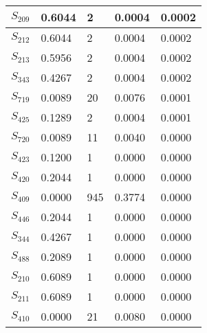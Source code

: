 \begin{xltabular}{\textwidth}{|X|X|X|X|X|}
 $S_{209}$ & 0.6044 & 2 & 0.0004 & 0.0002 \\ \hline
 $S_{212}$ & 0.6044 & 2 & 0.0004 & 0.0002 \\ \hline
 $S_{213}$ & 0.5956 & 2 & 0.0004 & 0.0002 \\ \hline
 $S_{343}$ & 0.4267 & 2 & 0.0004 & 0.0002 \\ \hline
 $S_{719}$ & 0.0089 & 20 & 0.0076 & 0.0001 \\ \hline
 $S_{425}$ & 0.1289 & 2 & 0.0004 & 0.0001 \\ \hline
 $S_{720}$ & 0.0089 & 11 & 0.0040 & 0.0000 \\ \hline
 $S_{423}$ & 0.1200 & 1 & 0.0000 & 0.0000 \\ \hline
 $S_{420}$ & 0.2044 & 1 & 0.0000 & 0.0000 \\ \hline
 $S_{409}$ & 0.0000 & 945 & 0.3774 & 0.0000 \\ \hline
 $S_{446}$ & 0.2044 & 1 & 0.0000 & 0.0000 \\ \hline
 $S_{344}$ & 0.4267 & 1 & 0.0000 & 0.0000 \\ \hline
 $S_{488}$ & 0.2089 & 1 & 0.0000 & 0.0000 \\ \hline
 $S_{210}$ & 0.6089 & 1 & 0.0000 & 0.0000 \\ \hline
 $S_{211}$ & 0.6089 & 1 & 0.0000 & 0.0000 \\ \hline
 $S_{410}$ & 0.0000 & 21 & 0.0080 & 0.0000 \\ \hline
    \end{xltabular}
    